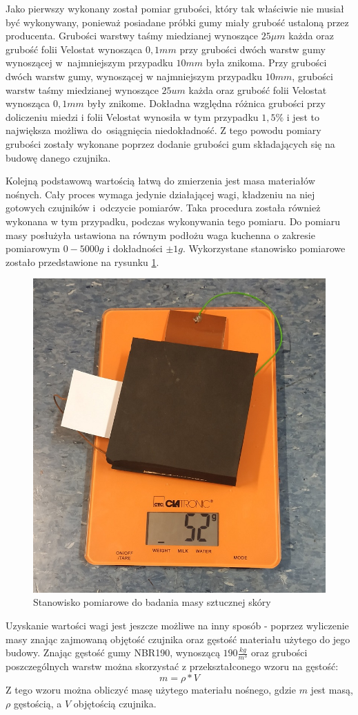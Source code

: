 Jako pierwszy wykonany został pomiar grubości, który tak właściwie nie musiał być wykonywany, ponieważ posiadane próbki gumy miały grubość ustaloną przez producenta. 
Grubości warstwy taśmy miedzianej wynoszące $25\mu m$ \cite{b_site_kamami_tasma} każda oraz grubość folii Velostat wynosząca $0,1 mm$ \cite{b_site_kamami_folia} przy grubości dwóch warstw gumy wynoszącej w~najmniejszym przypadku $10 mm$ była znikoma. 
Przy grubości dwóch warstw gumy, wynoszącej w najmniejszym przypadku $10mm$, grubości warstw taśmy miedzianej wynoszące $25um$ każda \cite{b_site_kamami_tasma} oraz grubość folii Velostat wynosząca $0,1mm$ \cite{b_site_kamami_folia} były znikome.
Dokładna względna różnica grubości przy doliczeniu miedzi i folii Velostat wynosiła w tym przypadku $1,5\%$ i jest to największa możliwa do~osiągnięcia niedokładność. Z tego powodu pomiary grubości zostały wykonane poprzez dodanie grubości gum składających się na budowę danego czujnika.

Kolejną podstawową wartością łatwą do zmierzenia jest masa materiałów nośnych. Cały proces wymaga jedynie działającej wagi, kładzeniu na niej gotowych czujników i~odczycie pomiarów. Taka procedura została również wykonana w tym przypadku, podczas wykonywania tego pomiaru. Do pomiaru masy posłużyła ustawiona na równym podłożu waga kuchenna o zakresie pomiarowym $0-5000 g$ i dokładności $\pm 1g$. Wykorzystane stanowisko pomiarowe zostało przedstawione na rysunku \ref{f_badanie_2_stanowisko_waga}.

\begin{figure}[!h]
    \centering 
    \includegraphics[width=0.5\linewidth]{img/badanie_2_stanowisko.jpg}
    \caption{Stanowisko pomiarowe do badania masy sztucznej skóry}
    \label{f_badanie_2_stanowisko_waga}
\end{figure}

Uzyskanie wartości wagi jest jeszcze możliwe na inny sposób - poprzez wyliczenie masy znając zajmowaną objętość czujnika oraz gęstość materiału użytego do jego budowy. Znając gęstość gumy NBR190, wynoszącą $190 \frac{kg}{m^3}$ oraz grubości poszczególnych warstw można skorzystać z przekształconego wzoru na gęstość:
\begin{equation}
    m = \rho*V
\end{equation}
Z tego wzoru można obliczyć masę użytego materiału nośnego, gdzie $m$ jest masą, $\rho$ gęstością, a $V$ objętością czujnika.

